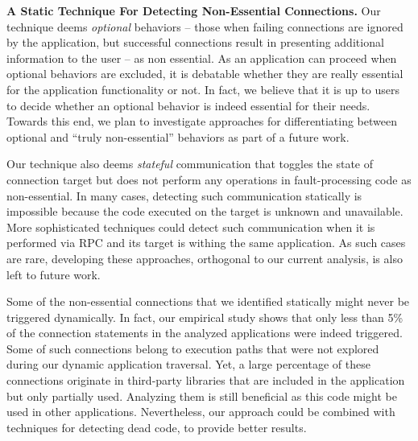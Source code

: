 \vspace{0.05in}
\noindent 
{\bf A Static Technique For Detecting Non-Essential Connections.}
Our technique deems \emph{optional} behaviors -- those when failing connections are ignored by the application, but successful connections result in presenting additional information to the user -- as non essential. 
As an application can proceed when optional behaviors are excluded, it is debatable whether they are really essential for the application functionality or not. 
In fact, we believe that it is up to users to decide whether an optional behavior is indeed essential for their needs. Towards this end, we plan to investigate approaches for differentiating between optional and ``truly non-essential'' behaviors as part of a future work. 

Our technique also deems \emph{stateful} communication that toggles the state of connection target but does not perform any operations in fault-processing code as non-essential. In many cases, detecting such communication statically is impossible because the code executed on the target is unknown and unavailable. 
More sophisticated techniques could detect such communication when it is performed via RPC and its target is withing the same application. As such cases are rare, developing these approaches, orthogonal to our current analysis, is also left to future work. 
 
Some of the non-essential connections that we identified statically might never be triggered dynamically. In fact, our empirical study shows that only less than 5\% of the connection statements in the analyzed applications were indeed triggered.
Some of such connections belong to execution paths that were not explored during our dynamic application traversal.
Yet, a large percentage of these connections originate in  
third-party libraries that are included in the application but only partially used. 
Analyzing them is still beneficial as this code might be used in other applications.
Nevertheless, our approach could be combined with techniques for detecting dead code, to provide better results.
